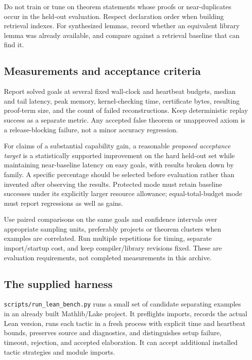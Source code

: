 \documentclass[11pt,letterpaper]{article}
\newcommand{\code}[1]{\texttt{#1}}
\theoremstyle{definition}\newtheorem{definition}[theorem]{Definition}
\theoremstyle{remark}\newtheorem{remark}[theorem]{Remark}
\begin{document}
Do not train or tune on theorem statements whose proofs or near-duplicates occur in the held-out evaluation. Respect declaration order when building retrieval indexes. For synthesized lemmas, record whether an equivalent library lemma was already available, and compare against a retrieval baseline that can find it.

\subsection{Measurements and acceptance criteria}
Report solved goals at several fixed wall-clock and heartbeat budgets, median and tail latency, peak memory, kernel-checking time, certificate bytes, resulting proof-term size, and the count of failed reconstructions. Keep deterministic replay success as a separate metric. Any accepted false theorem or unapproved axiom is a release-blocking failure, not a minor accuracy regression.

For claims of a substantial capability gain, a reasonable \emph{proposed acceptance target} is a statistically supported improvement on the hard held-out set while maintaining near-baseline latency on easy goals, with results broken down by family. A specific percentage should be selected before evaluation rather than invented after observing the results. Protected mode must retain baseline successes under its explicitly larger resource allowance; equal-total-budget mode must report regressions as well as gains.

Use paired comparisons on the same goals and confidence intervals over appropriate sampling units, preferably projects or theorem clusters when examples are correlated. Run multiple repetitions for timing, separate import/startup cost, and keep compiler/library revisions fixed. These are evaluation requirements, not completed measurements in this archive.

\subsection{The supplied harness}
\code{scripts/run\_lean\_bench.py} runs a small set of candidate separating examples in an already built Mathlib/Lake project. It preflights imports, records the actual Lean version, runs each tactic in a fresh process with explicit time and heartbeat bounds, preserves source and diagnostics, and distinguishes setup failure, timeout, rejection, and accepted elaboration. It can accept additional installed tactic strategies and module imports.
\end{document}
